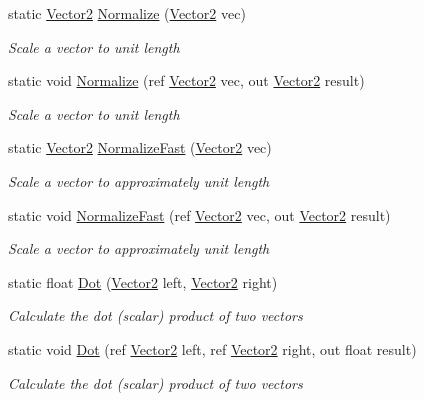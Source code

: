 \begin{DoxyCompactItemize}
static \hyperlink{struct_open_t_k_1_1_vector2}{Vector2} \hyperlink{struct_open_t_k_1_1_vector2_ac812cff9fa017a4764ff7a97f55a76df}{Normalize} (\hyperlink{struct_open_t_k_1_1_vector2}{Vector2} vec)
\begin{DoxyCompactList}\small\item\em Scale a vector to unit length \end{DoxyCompactList}\item 
static void \hyperlink{struct_open_t_k_1_1_vector2_a48eb61d843f7128a69969c606f66bcb6}{Normalize} (ref \hyperlink{struct_open_t_k_1_1_vector2}{Vector2} vec, out \hyperlink{struct_open_t_k_1_1_vector2}{Vector2} result)
\begin{DoxyCompactList}\small\item\em Scale a vector to unit length \end{DoxyCompactList}\item 
static \hyperlink{struct_open_t_k_1_1_vector2}{Vector2} \hyperlink{struct_open_t_k_1_1_vector2_aac5df88b123e60274175aa0e1645450e}{Normalize\-Fast} (\hyperlink{struct_open_t_k_1_1_vector2}{Vector2} vec)
\begin{DoxyCompactList}\small\item\em Scale a vector to approximately unit length \end{DoxyCompactList}\item 
static void \hyperlink{struct_open_t_k_1_1_vector2_a5f8b6f8d883e6b8ee67ef2d9a42096fe}{Normalize\-Fast} (ref \hyperlink{struct_open_t_k_1_1_vector2}{Vector2} vec, out \hyperlink{struct_open_t_k_1_1_vector2}{Vector2} result)
\begin{DoxyCompactList}\small\item\em Scale a vector to approximately unit length \end{DoxyCompactList}\item 
static float \hyperlink{struct_open_t_k_1_1_vector2_a5042b8afaa21175a455e8dfd3f1cb6b3}{Dot} (\hyperlink{struct_open_t_k_1_1_vector2}{Vector2} left, \hyperlink{struct_open_t_k_1_1_vector2}{Vector2} right)
\begin{DoxyCompactList}\small\item\em Calculate the dot (scalar) product of two vectors \end{DoxyCompactList}\item 
static void \hyperlink{struct_open_t_k_1_1_vector2_a9f8c59cce1647599d97f4c3b7d760fc2}{Dot} (ref \hyperlink{struct_open_t_k_1_1_vector2}{Vector2} left, ref \hyperlink{struct_open_t_k_1_1_vector2}{Vector2} right, out float result)
\begin{DoxyCompactList}\small\item\em Calculate the dot (scalar) product of two vectors \end{DoxyCompactList}\item 

\end{DoxyCompactItemize}
